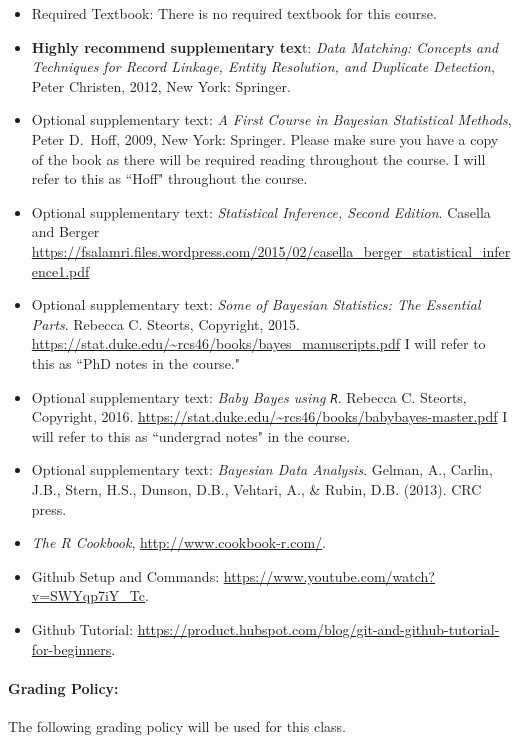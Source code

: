 \documentclass[11pt]{article}
\begin{document}
\begin{itemize}
\item[] Required Textbook: There is no required textbook for this course.
\item[] \textbf{Highly recommend supplementary tex}t: \textit{Data Matching: Concepts and Techniques for Record Linkage, Entity Resolution, and Duplicate Detection}, Peter Christen, 2012, New York: Springer.
\item[] Optional supplementary text: \textit{A First Course in Bayesian Statistical Methods}, Peter D.\ Hoff, 2009, New York: Springer. Please make sure you have a copy of the book as there will be required reading throughout the course. I will refer to this as ``Hoff" throughout the course.
\item[] Optional supplementary text:  \textit{Statistical Inference, Second Edition}. Casella and Berger \url{https://fsalamri.files.wordpress.com/2015/02/casella_berger_statistical_inference1.pdf}
\item[] Optional supplementary text:  \textit{Some of Bayesian Statistics: The Essential Parts}. Rebecca C. Steorts, Copyright, 2015. \url{https://stat.duke.edu/~rcs46/books/bayes_manuscripts.pdf} I will refer to this as ``PhD notes in the course."
\item[] Optional supplementary text:  \textit{Baby Bayes using \texttt{R}}. Rebecca C. Steorts, Copyright, 2016.
\url{https://stat.duke.edu/~rcs46/books/babybayes-master.pdf} I will refer to this as ``undergrad notes" in the course.
\item[] Optional supplementary text:  \textit{Bayesian Data Analysis}. Gelman, A., Carlin, J.B., Stern, H.S., Dunson, D.B., Vehtari, A., \& Rubin, D.B. (2013). CRC press.
\item[] \emph{The R Cookbook}, \url{http://www.cookbook-r.com/}.
\item[] Github Setup and Commands: \url{https://www.youtube.com/watch?v=SWYqp7iY_Tc}.
\item[] Github Tutorial: \url{https://product.hubspot.com/blog/git-and-github-tutorial-for-beginners}.

\end{itemize}

\newpage
\paragraph{Grading Policy:}
The following grading policy will be used for this class.
\end{document}
